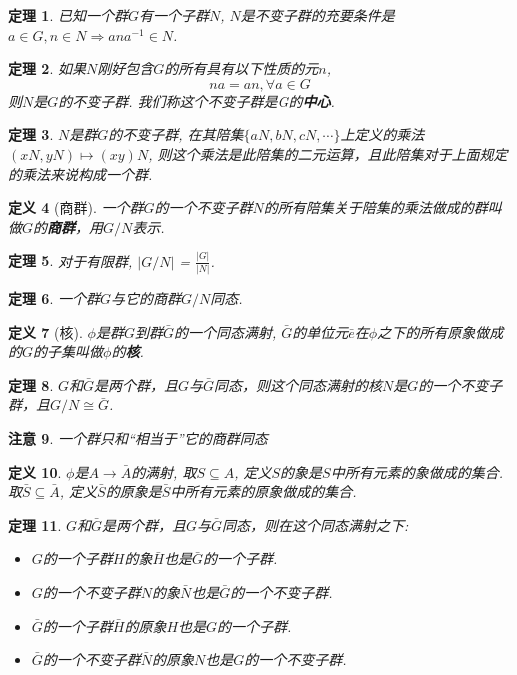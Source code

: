 \documentclass[UTF8]{ctexart}
\newtheorem{Definition}{定义}%
\newtheorem{Theorem}[Definition]{定理}
\newtheorem{Remark}[Definition]{注意}
\begin{document}
\begin{Theorem}
已知一个群$G$有一个子群$N$, $N$是不变子群的充要条件是
$a \in G, n \in N \Rightarrow ana^{-1} \in N $.
\end{Theorem}

\begin{Theorem}
如果$N$刚好包含$G$的所有具有以下性质的元$n$,
$$
	na = an, \forall a \in G
$$
则$N$是$G$的不变子群. 我们称这个不变子群是G的\textbf{中心}.
\end{Theorem}

\begin{Theorem}
$N$是群$G$的不变子群, 在其陪集$\{ aN, bN, cN, \cdots \}$上定义的乘法$(xN, yN) \mapsto (xy)N$, 则这个乘法是此陪集的二元运算，且此陪集对于上面规定的乘法来说构成一个群.
\end{Theorem}

\begin{Definition}[商群]
一个群$G$的一个不变子群$N$的所有陪集关于陪集的乘法做成的群叫做$G$的\textbf{商群}，用$G/N$表示.
\end{Definition}

\begin{Theorem}
对于有限群, $ \displaystyle | G/N | $ = $\frac{|G|}{|N|}$.
\end{Theorem}

\begin{Theorem}
一个群$G$与它的商群$G/N$同态.
\end{Theorem}

\begin{Definition}[核]
$\phi$是群$G$到群$\bar{G}$的一个同态满射, $\bar{G}$的单位元$\bar{e}$在$\phi$之下的所有原象做成的$G$的子集叫做$\phi$的\textbf{核}.
\end{Definition}

\begin{Theorem}
$G$和$\bar{G}$是两个群，且$G$与$\bar{G}$同态，则这个同态满射的核$N$是$G$的一个不变子群，且$G/N \cong \bar{G}$.
\end{Theorem}

\begin{Remark}
一个群只和``相当于''它的商群同态
\end{Remark}

\begin{Definition}
$\phi$是$A \rightarrow \bar{A}$的满射, 取$S \subseteq A$, 定义$S$的象是$S$中所有元素的象做成的集合. 取$\bar{S} \subseteq \bar{A}$, 定义$\bar{S}$的原象是$\bar{S}$中所有元素的原象做成的集合.
\end{Definition}

\begin{Theorem}
$G$和$\bar{G}$是两个群，且$G$与$\bar{G}$同态，则在这个同态满射之下:
\begin{itemize}
\item[(1)] $G$的一个子群$H$的象$\bar{H}$也是$\bar{G}$的一个子群.
\item[(2)] $G$的一个不变子群$N$的象$\bar{N}$也是$\bar{G}$的一个不变子群.
\item[(1')] $\bar{G}$的一个子群$\bar{H}$的原象$H$也是$G$的一个子群.
\item[(2')] $\bar{G}$的一个不变子群$\bar{N}$的原象$N$也是$G$的一个不变子群.
\end{itemize}
\end{Theorem}
\end{document}
